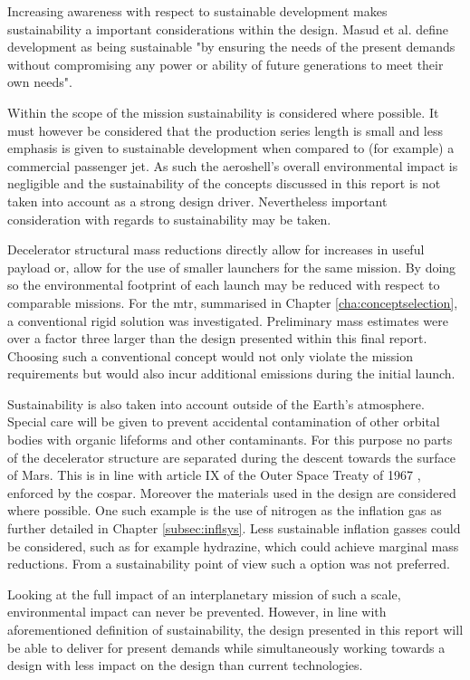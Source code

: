 Increasing awareness with respect to sustainable development makes sustainability a important considerations within the design. Masud et al. define development as being sustainable "by ensuring the needs of the present demands without compromising any power or ability of future generations to meet their own needs"\cite[p.85]{Masud2011}. 

Within the scope of the mission sustainability is considered where possible. It must however be considered that the production series length is small and less emphasis is given to sustainable development when compared to (for example) a commercial passenger jet. As such the aeroshell's overall environmental impact is negligible and the sustainability of the concepts discussed in this report is not taken into account as a strong design driver. Nevertheless important consideration with regards to sustainability may be taken. 

Decelerator structural mass reductions directly allow for increases in useful payload or, allow for the use of smaller launchers for the same mission. By doing so the environmental footprint of each launch may be reduced with respect to comparable missions. For the \gls{mtr}, summarised in Chapter \ref{cha:conceptselection},  a conventional rigid solution was investigated. Preliminary mass estimates were over a factor three larger than the design presented within this final report. Choosing such a conventional concept would not only violate the mission requirements but would also incur additional emissions during the initial launch.

Sustainability is also taken into account outside of the Earth's atmosphere. Special care will be given to prevent accidental contamination of other orbital bodies with organic lifeforms and other contaminants. For this purpose no parts of the decelerator structure are separated during the descent towards the surface of Mars. This is in line with article IX of the Outer Space Treaty of 1967 \cite{UnitedNations2008}, enforced by the \acrfull{cospar}. Moreover the materials used in the design are considered where possible. One such example is the use of nitrogen as the inflation gas as further detailed in Chapter \ref{subsec:inflsys}. Less sustainable inflation gasses could be considered, such as for example hydrazine, which could achieve marginal mass reductions. From a sustainability point of view such a option was not preferred.

Looking at the full impact of an interplanetary mission of such a scale, environmental impact can never be prevented. However, in line with aforementioned definition of sustainability, the design presented in this report will be able to deliver for present demands while simultaneously working towards a design with less impact on the design than current technologies.

